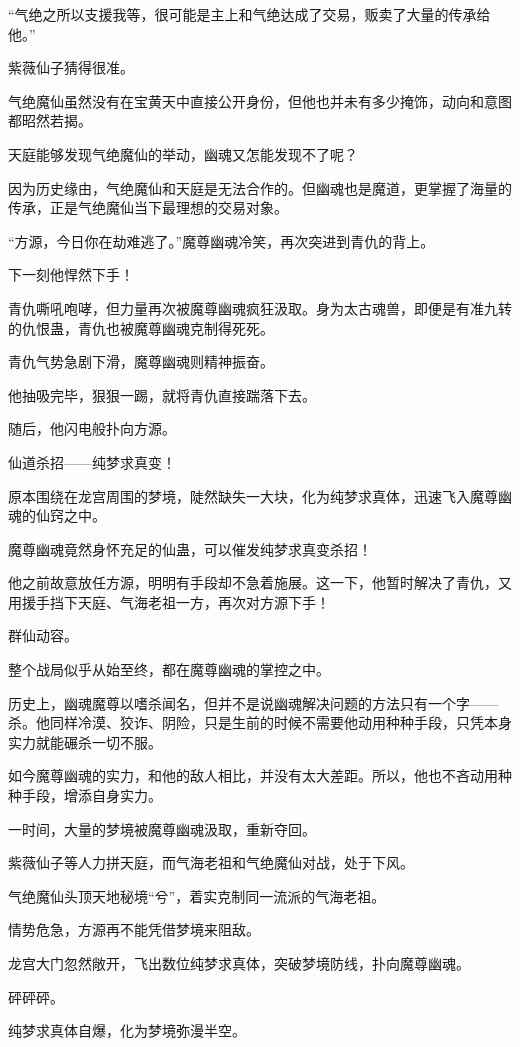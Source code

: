 \begin{this_body}
“气绝之所以支援我等，很可能是主上和气绝达成了交易，贩卖了大量的传承给他。”

紫薇仙子猜得很准。

气绝魔仙虽然没有在宝黄天中直接公开身份，但他也并未有多少掩饰，动向和意图都昭然若揭。

天庭能够发现气绝魔仙的举动，幽魂又怎能发现不了呢？

因为历史缘由，气绝魔仙和天庭是无法合作的。但幽魂也是魔道，更掌握了海量的传承，正是气绝魔仙当下最理想的交易对象。

“方源，今日你在劫难逃了。”魔尊幽魂冷笑，再次突进到青仇的背上。

下一刻他悍然下手！

青仇嘶吼咆哮，但力量再次被魔尊幽魂疯狂汲取。身为太古魂兽，即便是有准九转的仇恨蛊，青仇也被魔尊幽魂克制得死死。

青仇气势急剧下滑，魔尊幽魂则精神振奋。

他抽吸完毕，狠狠一踢，就将青仇直接踹落下去。

随后，他闪电般扑向方源。

仙道杀招——纯梦求真变！

原本围绕在龙宫周围的梦境，陡然缺失一大块，化为纯梦求真体，迅速飞入魔尊幽魂的仙窍之中。

魔尊幽魂竟然身怀充足的仙蛊，可以催发纯梦求真变杀招！

他之前故意放任方源，明明有手段却不急着施展。这一下，他暂时解决了青仇，又用援手挡下天庭、气海老祖一方，再次对方源下手！

群仙动容。

整个战局似乎从始至终，都在魔尊幽魂的掌控之中。

历史上，幽魂魔尊以嗜杀闻名，但并不是说幽魂解决问题的方法只有一个字——杀。他同样冷漠、狡诈、阴险，只是生前的时候不需要他动用种种手段，只凭本身实力就能碾杀一切不服。

如今魔尊幽魂的实力，和他的敌人相比，并没有太大差距。所以，他也不吝动用种种手段，增添自身实力。

一时间，大量的梦境被魔尊幽魂汲取，重新夺回。

紫薇仙子等人力拼天庭，而气海老祖和气绝魔仙对战，处于下风。

气绝魔仙头顶天地秘境“兮”，着实克制同一流派的气海老祖。

情势危急，方源再不能凭借梦境来阻敌。

龙宫大门忽然敞开，飞出数位纯梦求真体，突破梦境防线，扑向魔尊幽魂。

砰砰砰。

纯梦求真体自爆，化为梦境弥漫半空。


\end{this_body}
